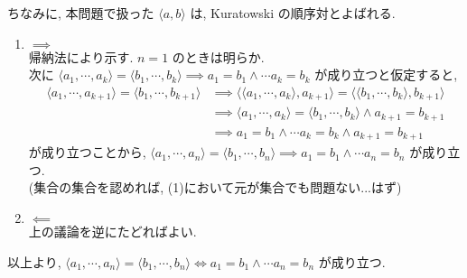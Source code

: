\begin{nmprob}
{ちなみに, 本問題で扱った $\langle a, b\rangle$ は, Kuratowski の順序対とよばれる.
\item
\begin{enumerate}
    \item $\implies$\\
    帰納法により示す.
    $n = 1$ のときは明らか.\\
    次に $\langle a_1, \cdots, a_k \rangle = \langle b_1, \cdots, b_k \rangle \implies a_1 = b_1 \land \cdots a_k = b_k$ が成り立つと仮定すると,
    \begin{align*}
        \langle a_1, \cdots, a_{k+1} \rangle = \langle b_1, \cdots, b_{k+1} \rangle &\implies \langle \langle a_1, \cdots, a_k \rangle, a_{k+1} \rangle = \langle \langle b_1, \cdots, b_k \rangle, b_{k+1} \rangle \\
        &\implies \langle a_1, \cdots, a_k \rangle = \langle b_1, \cdots, b_k \rangle \land a_{k+1} = b_{k+1}\\
        &\implies a_1 = b_1 \land \cdots a_k = b_k \land a_{k+1} = b_{k+1}
    \end{align*}
    が成り立つことから, $\langle a_1, \cdots, a_n \rangle = \langle b_1, \cdots, b_n \rangle \implies a_1 = b_1 \land \cdots a_n = b_n$ が成り立つ.\\
    (集合の集合を認めれば, (1)において元が集合でも問題ない...はず)
    \item $\impliedby$\\
    上の議論を逆にたどればよい.
\end{enumerate}
以上より, $\langle a_1, \cdots, a_n \rangle = \langle b_1, \cdots, b_n \rangle \iff a_1 = b_1 \land \cdots a_n = b_n$ が成り立つ.
}
\end{nmprob}




